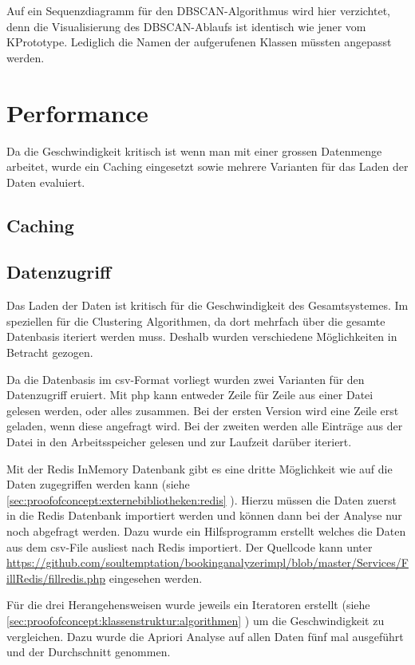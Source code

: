 Auf ein Sequenzdiagramm für den DBSCAN-Algorithmus wird hier verzichtet, denn die Visualisierung des DBSCAN-Ablaufs ist identisch wie jener vom KPrototype. Lediglich die Namen der aufgerufenen Klassen müssten angepasst werden.


\section{Performance}
Da die Geschwindigkeit kritisch ist wenn man mit einer grossen Datenmenge arbeitet, wurde ein Caching eingesetzt sowie mehrere Varianten für das Laden der Daten evaluiert.

\subsection{Caching}
\label{sec:proofofconcept:performance:caching}

\subsection{Datenzugriff}
\label{sec:proofofconcept:performance:datenzugriff}
Das Laden der Daten ist kritisch für die Geschwindigkeit des Gesamtsystemes. Im speziellen für die Clustering Algorithmen, da dort mehrfach über die gesamte Datenbasis iteriert werden muss. Deshalb wurden verschiedene Möglichkeiten in Betracht gezogen.

Da die Datenbasis im \gls{csv}-Format vorliegt wurden zwei Varianten für den Datenzugriff eruiert. Mit \gls{php} kann entweder Zeile für Zeile aus einer Datei gelesen werden, oder alles zusammen.  Bei der ersten Version wird eine Zeile erst geladen, wenn diese angefragt wird. Bei der zweiten werden alle Einträge aus der Datei in den Arbeitsspeicher gelesen und zur Laufzeit darüber iteriert.

Mit der Redis InMemory Datenbank gibt es eine dritte Möglichkeit wie auf die Daten zugegriffen werden kann (siehe \cref{sec:proofofconcept:externebibliotheken:redis} ). Hierzu müssen die Daten zuerst in die Redis Datenbank importiert werden und können dann bei der Analyse nur noch abgefragt werden. Dazu wurde ein Hilfsprogramm erstellt welches die Daten aus dem \gls{csv}-File ausliest nach Redis importiert. Der Quellcode kann unter \url{https://github.com/soultemptation/bookinganalyzerimpl/blob/master/Services/FillRedis/fillredis.php} eingesehen werden.

Für die drei Herangehensweisen wurde jeweils ein Iteratoren erstellt (siehe \cref{sec:proofofconcept:klassenstruktur:algorithmen} ) um die Geschwindigkeit zu vergleichen. Dazu wurde die Apriori Analyse auf allen Daten fünf mal ausgeführt und der Durchschnitt genommen.

